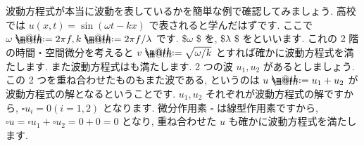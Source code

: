 \documentclass[openany, a4paper, oneside]{jsbook}
\makeatletter
\newcommand*{\defeq}{\mathrel{\rlap{%
\raisebox{0.3ex}{$\m@th\cdot$}}%
\raisebox{-0.3ex}{$\m@th\cdot$}}%
=}
\theoremstyle{break}
\theoremstyle{breakdefn}
\makeatother
\begin{document}
波動方程式が本当に波動を表しているかを簡単な例で確認してみましょう.
高校では $u (x,t) = \sin (\omega t - k x)$ で表されると学んだはずです.
ここで $\omega \defeq 2 \pi f , k \defeq 2 \pi f/\lambda$ です.
\$$\omega$ \$ を,
\$$\lambda$ \$ をといいます.
これの 2 階の時間・空間微分を考えると $v\defeq\sqrt{\omega  /k}$ とすれば確かに波動方程式を満たします.
また波動方程式はも満たします.
2 つの波 $u_1,u_2$ があるとしましょう. この 2 つを重ね合わせたものもまた波である, というのは $u \defeq u_1 + u_2$ が
波動方程式の解となるということです.  $u_1,u_2$ それぞれが波動方程式の解ですから,
$\square u_i = 0 ( i=1,2 )$ となります.
微分作用素 $\square$ は線型作用素ですから,  $\square u = \square u_1 + \square u_2 = 0 + 0 = 0$ となり,
重ね合わせた $u$ も確かに波動方程式を満たします.
\end{document}
